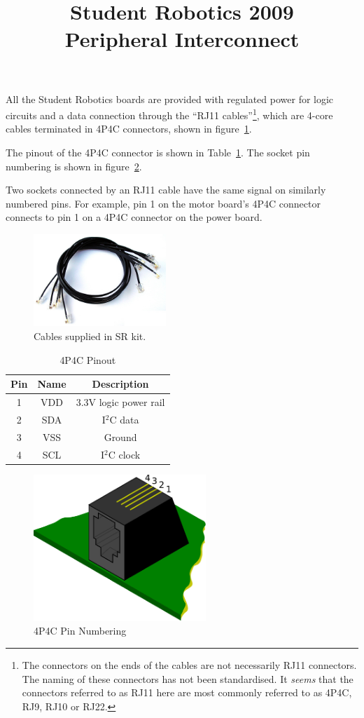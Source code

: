 \documentclass[a4paper,twocolumn]{article}
\title{Student Robotics 2009\\ Peripheral Interconnect}
\newcommand{\itwoc}{I$^2$C }
\begin{document}
\maketitle

All the Student Robotics boards are provided with regulated power for logic circuits and a data connection through the ``RJ11 cables''\footnote{The connectors on the ends of the cables are not necessarily RJ11 connectors.  The naming of these connectors has not been standardised.  It \emph{seems} that the connectors referred to as RJ11 here are most commonly referred to as 4P4C, RJ9, RJ10 or RJ22.}, which are 4-core cables terminated in 4P4C connectors, shown in figure~\ref{fig:coil}.

The pinout of the 4P4C connector is shown in Table~\ref{tab:4p4c-pinout}.  The socket pin numbering is shown in figure~\ref{fig:4p4c-pin-num}.

Two sockets connected by an RJ11 cable have the same signal on similarly numbered pins.  For example, pin 1 on the motor board's 4P4C connector connects to pin 1 on a 4P4C connector on the power board.

\begin{figure}
  \begin{center}
    \includegraphics[width=5cm]{./images/coil.jpg}
  \end{center}
  \caption{\label{fig:coil}Cables supplied in SR kit.}
\end{figure}

\begin{table}
  \caption{\label{tab:4p4c-pinout}4P4C Pinout}

  \begin{center}
    \begin{tabular}{|c|c|c|}
      \hline
      \textbf{Pin} & \textbf{Name} & \textbf{Description} \\
      \hline
      1 & VDD & 3.3V logic power rail\\
      2 & SDA & \itwoc data \\
      3 & VSS & Ground \\
      4 & SCL & \itwoc clock\\
      \hline
    \end{tabular}
  \end{center}
\end{table}


\begin{figure}
  \begin{center}
    \includegraphics[width=6.5cm]{./images/4p4c.pdf}
  \end{center}
  \caption{\label{fig:4p4c-pin-num}4P4C Pin Numbering}
\end{figure}
\end{document}
